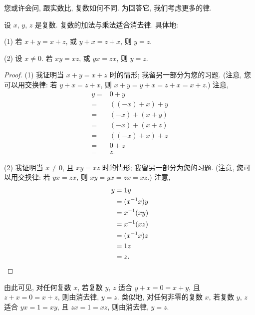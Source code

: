 \documentclass[../libro.tex]{subfiles}
\begin{document}
您或许会问, 跟实数比, 复数如何不同.
为回答它, 我们考虑更多的律.

\begin{theorem}
    设 \(x\), \(y\), \(z\) 是复数.
    复数的加法与乘法适合消去律.
    具体地:

    (1)
    若 \(x + y = x + z\), 或 \(y + x = z + x\),
    则 \(y = z\).

    (2)
    设 \(x \neq 0\).
    若 \(x y = x z\), 或 \(y x = z x\),
    则 \(y = z\).
\end{theorem}

\begin{proof}
    (1)
    我证明当 \(x + y = x + z\) 时的情形;
    我留另一部分为您的习题.
    (注意, 您可以用交换律: %
    若 \(y + x = z + x\),
    则 \(x + y = y + x = z + x = x + z\).) %
    注意,
    \begin{align*}
        y
        = {} & 0 + y          \\
        = {} & ((-x) + x) + y \\
        = {} & (-x) + (x + y) \\
        = {} & (-x) + (x + z) \\
        = {} & ((-x) + x) + z \\
        = {} & 0 + z          \\
        = {} & z.
    \end{align*}

    (2)
    我证明当 \(x \neq 0\), 且 \(x y = x z\) 时的情形;
    我留另一部分为您的习题.
    (注意, 您可以用交换律: %
    若 \(y x = z x\),
    则 \(x y = y x = z x = x z\).) %
    注意,
    \begin{align*}
        y
        = {} & 1 y          \\
        = {} & (x^{-1} x) y \\
        = {} & x^{-1} (x y) \\
        = {} & x^{-1} (x z) \\
        = {} & (x^{-1} x) z \\
        = {} & 1 z          \\
        = {} & z.
        \qedhere
    \end{align*}
\end{proof}

由此可见, 对任何复数 \(x\),
若复数 \(y\), \(z\) 适合
\(y + x = 0 = x + y\),
且 \(z + x = 0 = x + z\),
则由消去律, \(y = z\).
类似地, 对任何非零的复数 \(x\),
若复数 \(y\), \(z\) 适合
\(y x = 1 = x y\),
且 \(z x = 1 = x z\),
则由消去律, \(y = z\).
\end{document}
